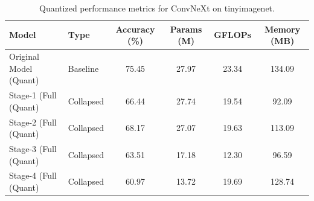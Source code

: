 \begin{table}
\caption{Quantized performance metrics for ConvNeXt on tinyimagenet.}
\label{tab:ConvNeXt_tinyimagenet_quant}
\begin{tabular}{llcccc}
\toprule
Model & Type & Accuracy (\%) & Params (M) & GFLOPs & Memory (MB) \\
\midrule
Original Model
(Quant) & Baseline & 75.45 & 27.97 & 23.34 & 134.09 \\
Stage-1 (Full
(Quant) & Collapsed & 66.44 & 27.74 & 19.54 & 92.09 \\
Stage-2 (Full
(Quant) & Collapsed & 68.17 & 27.07 & 19.63 & 113.09 \\
Stage-3 (Full
(Quant) & Collapsed & 63.51 & 17.18 & 12.30 & 96.59 \\
Stage-4 (Full
(Quant) & Collapsed & 60.97 & 13.72 & 19.69 & 128.74 \\
\bottomrule
\end{tabular}
\end{table}

